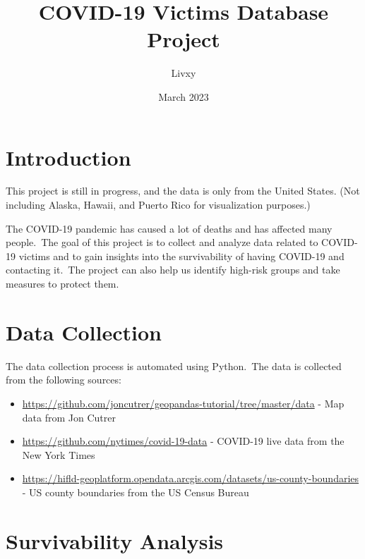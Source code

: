 \documentclass{article}
\begin{document}
\title{COVID-19 Victims Database Project}
\author{Livxy}
\date{March 2023}

\maketitle
\thispagestyle{empty}
\vspace{50cm}
\setlength{\columnsep}{14pt}


\section{Introduction}
\begin{boxH}
	This project is still in progress, and the data is only from the United States. (Not including Alaska, Hawaii, and Puerto Rico for visualization purposes.)
\end{boxH}

\indent

The COVID-19 pandemic has caused a lot of deaths and has affected many people.\
The goal of this project is to collect and analyze data related to COVID-19 victims and to gain insights into the survivability of having COVID-19 and contacting it.\
The project can also help us identify high-risk groups and take measures to protect them.


\section{Data Collection}
\indent

The data collection process is automated using Python.\
The data is collected from the following sources: \
\begin{itemize}
	\item \cite{cutrer} \url{https://github.com/joncutrer/geopandas-tutorial/tree/master/data} - Map data from Jon Cutrer
	\item \cite{nytimes} \url{https://github.com/nytimes/covid-19-data} - COVID-19 live data from the New York Times
	\item \cite{census} \url{https://hifld-geoplatform.opendata.arcgis.com/datasets/us-county-boundaries} - US county boundaries from the US Census Bureau
\end{itemize}



\section{Survivability Analysis}
\end{document}
